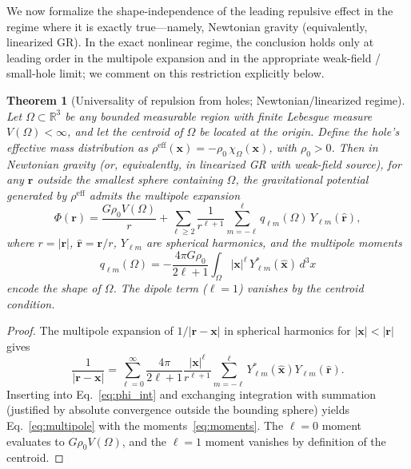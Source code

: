 \documentclass[%
  reprint,
  superscriptaddress,
  showpacs,
  showkeys,
  amsmath,amssymb,
  pra,
  longbibliography,
  floatfix,
  x11names
]{revtex4-2}
\newtheorem{theorem}{Theorem}
\begin{document}
We now formalize the shape-independence of the leading repulsive effect in the regime where it is exactly true---namely, Newtonian gravity (equivalently, linearized GR). In the exact nonlinear regime, the conclusion holds only at leading order in the multipole expansion and in the appropriate weak-field / small-hole limit; we comment on this restriction explicitly below.

\begin{theorem}[Universality of repulsion from holes; Newtonian/linearized regime]
\label{thm:universality}
Let $\Omega \subset \mathbb{R}^3$ be any bounded measurable region with finite Lebesgue measure $V(\Omega) < \infty$, and let the centroid of $\Omega$ be located at the origin. Define the hole's effective mass distribution as $\rho^{\mathrm{eff}}(\mathbf{x}) = -\rho_0\, \chi_\Omega(\mathbf{x})$, with $\rho_0 > 0$. Then in Newtonian gravity (or, equivalently, in linearized GR with weak-field source), for any $\mathbf{r}$ outside the smallest sphere containing $\Omega$, the gravitational potential generated by $\rho^{\mathrm{eff}}$ admits the multipole expansion
\begin{equation}
\Phi(\mathbf{r}) = \frac{G \rho_0 V(\Omega)}{r} + \sum_{\ell \geq 2} \frac{1}{r^{\ell+1}} \sum_{m=-\ell}^{\ell} q_{\ell m}(\Omega)\, Y_{\ell m}(\hat{\mathbf{r}}),
\label{eq:multipole}
\end{equation}
where $r = |\mathbf{r}|$, $\hat{\mathbf{r}} = \mathbf{r}/r$, $Y_{\ell m}$ are spherical harmonics, and the multipole moments
\begin{equation}
q_{\ell m}(\Omega) = -\frac{4\pi G \rho_0}{2\ell+1} \int_\Omega |\mathbf{x}|^\ell\, Y_{\ell m}^*(\hat{\mathbf{x}})\, d^3x
\label{eq:moments}
\end{equation}
encode the shape of $\Omega$. The dipole term ($\ell = 1$) vanishes by the centroid condition.
\end{theorem}

\begin{proof}
The multipole expansion of $1/|\mathbf{r} - \mathbf{x}|$ in spherical harmonics for $|\mathbf{x}| < |\mathbf{r}|$ gives
\begin{equation}
\frac{1}{|\mathbf{r} - \mathbf{x}|} = \sum_{\ell=0}^\infty \frac{4\pi}{2\ell+1} \frac{|\mathbf{x}|^\ell}{r^{\ell+1}} \sum_{m=-\ell}^{\ell} Y_{\ell m}^*(\hat{\mathbf{x}}) Y_{\ell m}(\hat{\mathbf{r}}).
\end{equation}
Inserting into Eq.~\eqref{eq:phi_int} and exchanging integration with summation (justified by absolute convergence outside the bounding sphere) yields Eq.~\eqref{eq:multipole} with the moments~\eqref{eq:moments}. The $\ell = 0$ moment evaluates to $G \rho_0 V(\Omega)$, and the $\ell = 1$ moment vanishes by definition of the centroid.
\end{proof}
\end{document}

